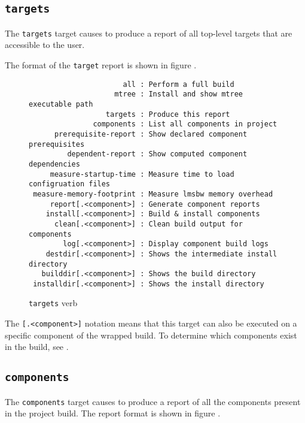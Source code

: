 \subsection{\texttt{targets}}

The \texttt{targets} target causes \lmsbw to produce a report of all
top-level targets that are accessible to the user.

The format of the \texttt{target} report is shown in figure
.

\begin{figure}[tbh]
\hrulefill
\begin{footnotesize}
\begin{verbatim}
                      all : Perform a full build
                    mtree : Install and show mtree executable path
                  targets : Produce this report
               components : List all components in project
      prerequisite-report : Show declared component prerequisites
         dependent-report : Show computed component dependencies
     measure-startup-time : Measure time to load configruation files
 measure-memory-footprint : Measure lmsbw memory overhead
     report[.<component>] : Generate component reports
    install[.<component>] : Build & install components
      clean[.<component>] : Clean build output for components
        log[.<component>] : Display component build logs
    destdir[.<component>] : Shows the intermediate install directory
   builddir[.<component>] : Shows the build directory
 installdir[.<component>] : Shows the install directory
\end{verbatim}
\end{footnotesize}
\hrulefill
\caption{\texttt{targets} verb}\label{usinglmsbw:targets-verb}
\end{figure}

The \texttt{[.<component>]} notation means that this target can also
be executed on a specific component of the wrapped build.  To
determine which components exist in the build, see
.

\subsection{\texttt{components}}\label{lmsbw:target:components}

The \texttt{components} target causes \lmsbw to produce a report of all
the components present in the project build.  The report format is
shown in figure .

